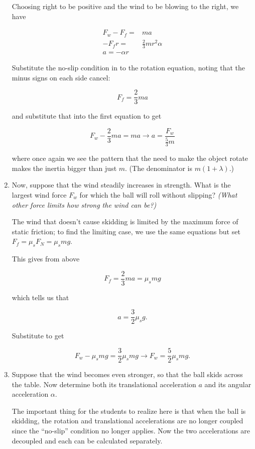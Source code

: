 \documentclass[12pt]{article}
\begin{document}
\begin{enumerate}
{	Choosing right to be positive and the wind to be blowing to the right, we have
	
	\begin{align*}
		F_w - F_f =& ma \\
		-F_f r =& \frac{2}{3}mr^2 \alpha \\
		a = - \alpha r
	\end{align*}

    Substitute the no-slip condition in to the rotation equation, noting that the minus signs on each side cancel:
    
    $$F_f = \frac{2}{3}ma$$
    
     and substitute that into the first equation to get
    
    $$F_w - \frac{2}{3}ma = ma \rightarrow a = \frac{F_w}{\frac{5}{3}m}$$
    
    where once again we see the pattern that the need to make the object rotate makes the inertia bigger than just $m$. (The denominator is $m(1 + \lambda)$.)
    
}
\newpage

\item Now, suppose that the wind steadily increases in strength. What is the largest wind force $F_w$ for which the ball will roll without slipping? {\it (What other force limits how strong the wind can be?)}

{\color{red}
	The wind that doesn't cause skidding is limited by the maximum force of static friction; to find the limiting case, we use the same equations but set $F_f = \mu_s F_N = \mu_s mg$.
	
	This gives from above
	
	$$F_f = \frac{2}{3}ma = \mu_s mg$$
	
	which tells us that
	
	$$a = \frac{3}{2} \mu_s g.$$
	
	Substitute to get
	
	$$F_w - \mu_s mg = \frac{3}{2} \mu_s mg \rightarrow F_w = \frac{5}{2}\mu_s mg.$$


}
	
	
\item Suppose that the wind becomes even stronger, so that the ball skids across the table. Now determine both its translational acceleration $a$ and its angular acceleration $\alpha$.

{\color{blue}
	
	The important thing for the students to realize here is that when the ball is skidding, the rotation and translational accelerations are no longer coupled since the ``no-slip'' condition no longer applies. Now the two accelerations are decoupled and each can be calculated separately.}


\end{enumerate}
\end{document}
